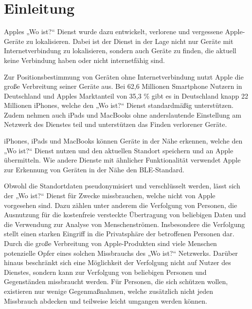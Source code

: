 
\section{Einleitung}

Apples „Wo ist?“ Dienst wurde dazu entwickelt, verlorene und vergessene Apple-Geräte zu lokalisieren.
Dabei ist der Dienst in der Lage nicht nur Geräte mit Internetverbindung zu lokalisieren, sondern auch Geräte zu finden, die aktuell keine Verbindung haben oder nicht internetfähig sind.

Zur Positionsbestimmung von Geräten ohne Internetverbindung nutzt Apple die große Verbreitung seiner Geräte aus.
Bei 62,6 Millionen Smartphone Nutzern in Deutschland \cite{Statista_SmartphonesDeutschland} und Apples Marktanteil von 35,3 \% \cite{Statscounter_Marktanteil_iOS} gibt es in Deutschland knapp 22 Millionen iPhones, welche den „Wo ist?“ Dienst standardmäßig unterstützen.
Zudem nehmen auch iPads und MacBooks ohne anderslautende Einstellung am Netzwerk des Dienstes teil und unterstützen das Finden verlorener Geräte.

iPhones, iPads und MacBooks können Geräte in der Nähe erkennen, welche den „Wo ist?“ Dienst nutzen und den aktuellen Standort speichern und an Apple übermitteln.
Wie andere Dienste mit ähnlicher Funktionalität verwendet Apple zur Erkennung von Geräten in der Nähe den \ac{BLE}-Standard.


Obwohl die Standortdaten pseudonymisiert und verschlüsselt werden, lässt sich der „Wo ist?“ Dienst für Zwecke missbrauchen, welche nicht von Apple vorgesehen sind.
Dazu zählen unter anderem die Verfolgung von Personen, die Ausnutzung für die kostenfreie versteckte Übertragung von beliebigen Daten und die Verwendung zur Analyse von Menschenströmen.
Insbesondere die Verfolgung stellt einen starken Eingriff in die Privatsphäre der betroffenen Personen dar.
Durch die große Verbreitung von Apple-Produkten sind viele Menschen potenzielle Opfer eines solchen Missbrauchs des „Wo ist?“ Netzwerks.
Darüber hinaus beschränkt sich eine Möglichkeit der Verfolgung nicht auf Nutzer des Dienstes, sondern kann zur Verfolgung von beliebigen Personen und Gegenständen missbraucht werden.
Für Personen, die sich schützen wollen, existieren nur wenige Gegenmaßnahmen, welche zusätzlich nicht jeden Missbrauch abdecken und teilweise leicht umgangen werden können.


